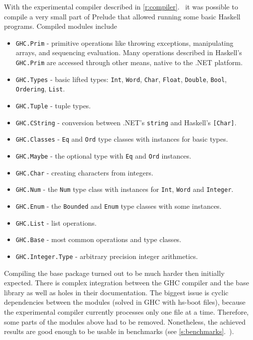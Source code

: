 \documentclass[en]{pracamgr}
\newcommand{\myref}[1]{\ref{#1}.~\textit{\nameref{#1}}}
\begin{document}
With the experimental compiler described in \myref{r:compiler}
it was possible to compile a very small part of Prelude that allowed
running some basic Haskell programs. Compiled modules include

\begin{itemize}
    \item \texttt{GHC.Prim} - primitive operations like throwing exceptions,
            manipulating arrays, and sequencing evaluation. Many
            operations described in Haskell's \texttt{GHC.Prim} are accessed
            through other means, native to the .NET platform.
    \item \texttt{GHC.Types} - basic lifted types: \texttt{Int}, \texttt{Word},
            \texttt{Char}, \texttt{Float}, \texttt{Double}, \texttt{Bool},
            \texttt{Ordering}, \texttt{List}.
    \item \texttt{GHC.Tuple} - tuple types.
    \item \texttt{GHC.CString} - conversion between .NET's \texttt{string} and
            Haskell's \texttt{[Char]}.
    \item \texttt{GHC.Classes} - \texttt{Eq} and \texttt{Ord} type classes with
            instances for basic types.
    \item \texttt{GHC.Maybe} - the optional type with \texttt{Eq} and \texttt{Ord} instances.
    \item \texttt{GHC.Char} - creating characters from integers.
    \item \texttt{GHC.Num} - the \texttt{Num} type class with instances for \texttt{Int},
            \texttt{Word} and \texttt{Integer}.
    \item \texttt{GHC.Enum} - the \texttt{Bounded} and \texttt{Enum} type classes with some instances.
    \item \texttt{GHC.List} - list operations.
    \item \texttt{GHC.Base} - most common operations and type classes.
    \item \texttt{GHC.Integer.Type} - arbitrary precision integer arithmetics.
\end{itemize}

Compiling the base package turned out to be much harder
then initially expected. There is complex integration between the GHC compiler and the
base library as well as holes in their documentation.
The biggest issue is cyclic dependencies between the modules (solved in GHC with hs-boot files),
because the experimental compiler currently processes only one file at a time.
Therefore, some parts of the modules above had to be removed.
Nonetheless, the achieved results are good enough to be usable in benchmarks
(see \myref{s:benchmarks}).
\end{document}
